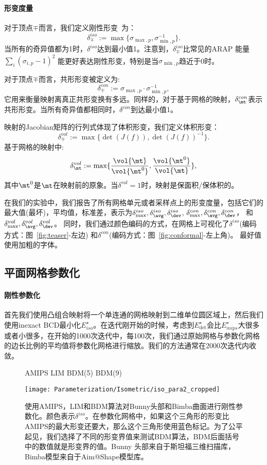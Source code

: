 \paragraph{形变度量}
对于顶点$\mp$而言，我们定义刚性形变~\cite{Sorkine2002}为：
$$\delta^{iso}_\mp:= \max \{\sigma_{\max,p}, \sigma^{-1}_{\min,p}\}.$$
当所有的奇异值都为1时，$\delta^{iso}$达到最小值1。注意到，$\delta^{iso}_\mp$比常见的ARAP 能量$\sum_i (\sigma_{i,p}-1)^2$ 能更好表达刚性形变，特别是当$\sigma_{\min,p}$趋近于0时。

对于顶点$\mp$而言，共形形变被定义为:
$$\delta^{con}_\mp:= \sigma_{\max,p}\cdot \sigma^{-1}_{\min,p},$$
它用来衡量映射离真正共形变换有多远。同样的，对于基于网格的映射，$\delta^{con}_\mt$表示共形形变。当所有奇异值都相同时，$\delta^{con}$到达最小值1。

映射的Jacobian矩阵的行列式体现了体积形变，我们定义体积形变：
$$\delta^{vol}_\mp:=\max\{\det(J(f)), \det(J(f))^{-1}\}.$$
基于网格的映射中:
$$\delta^{vol}_\mt:= \max\{\frac{\vol{\mt}}{\vol{\mt^0}}, \frac{\vol{\mt^0}}{\vol{\mt}}\},$$
其中$\mt^0$是$\mt$在映射前的原象。当$\delta^{vol} = 1$时，映射是保面积/保体积的。

在我们的实验中，我们报告了所有网格单元或者采样点上的形变度量，包括它们的最大值(最坏)，平均值，标准差，表示为$\delta^{iso}_{\max}, \delta^{iso}_{\avg}, \delta^{iso}_{\dev}$, $\delta^{con}_{\max}, \delta^{con}_{\avg}, \delta^{con}_{\dev}$， 和 $\delta^{vol}_{\max}, \delta^{vol}_{\avg}, \delta^{vol}_{\dev}$。 同时，我们通过颜色编码的方式，在网格上可视化了$\delta^{iso}$(编码方式：图~\ref{fig:teaser}-左边) 和$\delta^{con}$(编码方式：图~\ref{fig:conformal}-左上角)。 最好值使用加粗的字体。

\subsection{平面网格参数化}
\paragraph{刚性参数化}
首先我们使用凸组合映射将一个单连通的网格映射到二维单位圆区域上，然后我们使用inexact BCD最小化$E^{\star}_{iso}$。在迭代刚开始的时候，考虑到$E^{\star}_{\det}$会比$E^{\star}_{mips}$大很多或者小很多，在开始的1000次迭代中，每100次，我们通过原始网格与参数化网格的边长比例的平均值将参数化网格进行缩放。我们的方法通常在2000次迭代内收敛。
\begin{figure}[t]
    \centerline{AMIPS \hspace{0.16\linewidth} LIM \hspace{0.16\linewidth} BDM(5)\hspace{0.16\linewidth} BDM(9)}
    \centerline{
    \texttt{[image: Parameterization/Isometric/iso\_para2\_cropped]}
    }
  \caption{使用AMIPS，LIM和BDM算法对Bunny头部和Bimba曲面进行刚性参数化。颜色表示$\delta^{iso}$。在参数化网格中，如果这个三角形的形变比AMIPS的最大形变还要大，那么这个三角形使用蓝色标记。为了公平起见，我们选择了不同的形变界值来测试BDM算法，BDM后面括号中的数值就是形变界的值。Bunny 头部来自于斯坦福三维扫描库，Bimba模型来自于Aim@Shape模型库。}
  \label{fig:isopara}\vspace{-3mm}
\end{figure}

